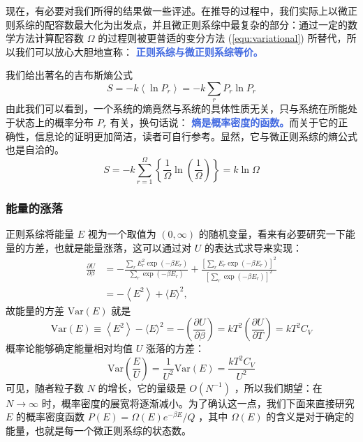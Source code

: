 \documentclass[hyperref,UTF-8]{ctexart}
\newcommand{\0}{\boldsymbol{0}}
\begin{document}
现在，有必要对我们所得的结果做一些评述。在推导的过程中，我们实际上以微正则系综的配容数最大化为出发点，并且微正则系综中最复杂的部分：通过一定的数学方法计算配容数 $\Omega$ 的过程则被更普适的变分方法 (\ref*{equ:variational}) 所替代，所以我们可以放心大胆地宣称： \textcolor{RoyalBlue}{\textbf{\kaishu  正则系综与微正则系综等价。}}

我们给出著名的吉布斯熵公式
\begin{equation}\label{equ:GibbsS}
    S=-k\left\langle\ln P_r\right\rangle=-k \sum_r P_r \ln P_r
\end{equation}
由此我们可以看到，一个系统的熵竟然与系统的具体性质无关，只与系统在所能处于状态上的概率分布 $P_r$ 有关，换句话说： \textcolor{RoyalBlue}{\textbf{\kaishu 熵是概率密度的函数。}}而关于它的正确性，信息论的证明更加简洁，读者可自行参考。显然，它与微正则系综的熵公式也是自洽的。
\[
    S=-k \sum_{r=1}^{\Omega}\left\{\frac{1}{\Omega} \ln \left(\frac{1}{\Omega}\right)\right\}=k \ln \Omega
\]

\subsubsection{能量的涨落}

正则系综将能量 $E$ 视为一个取值为 $(0, \infty)$ 的随机变量，看来有必要研究一下能量的方差，也就是能量涨落，这可以通过对 $U$ 的表达式求导来实现：
\[
    \begin{aligned}
\frac{\partial U}{\partial \beta} & =-\frac{\sum_r E_r^2 \exp \left(-\beta E_r\right)}{\sum_r \exp \left(-\beta E_r\right)}+\frac{\left[\sum_r E_r \exp \left(-\beta E_r\right)\right]^2}{\left[\sum_r \exp \left(-\beta E_r\right)\right]^2} \\
& =-\left\langle E^2\right\rangle+\langle E\rangle^2,
\end{aligned}
\]
故能量的方差 $\text{Var}(E)$ 就是
\begin{equation}\label{equ:label}
    \text{Var}(E) \equiv\left\langle E^2\right\rangle-\langle E\rangle^2=-\left(\frac{\partial U}{\partial \beta}\right)=k T^2\left(\frac{\partial U}{\partial T}\right)=k T^2 C_V
\end{equation}
概率论能够确定能量相对均值 $U$ 涨落的方差：
\[
    \text{Var}\left(\frac{E}{U} \right) = \frac{1}{U^2} \text{Var}(E) = \frac{k T^2 C_V}{U^2} 
\]
可见，随者粒子数 $N$ 的增长，它的量级是 $O(N^{-1})$ ，所以我们期望：在 $N \rightarrow \infty$ 时，概率密度的展宽将逐渐减小。为了确认这一点，我们下面来直接研究 $E$ 的概率密度函数 $P(E) = \Omega(E)e^{-\beta E}/Q$ ，其中 $\Omega(E)$ 的含义是对于确定的能量，也就是每一个微正则系综的状态数。
\end{document}
